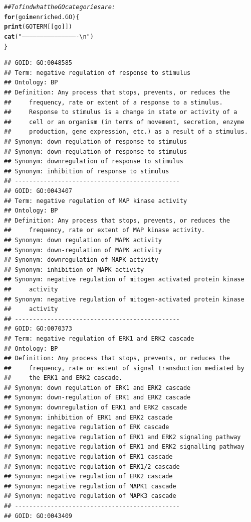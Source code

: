 \documentclass{article}\usepackage[]{graphicx}\usepackage[]{color}
\makeatletter
\newcommand{\hlstr}[1]{\textcolor[rgb]{0.192,0.494,0.8}{#1}}%
\newcommand{\hlcom}[1]{\textcolor[rgb]{0.678,0.584,0.686}{\textit{#1}}}%
\newcommand{\hlstd}[1]{\textcolor[rgb]{0.345,0.345,0.345}{#1}}%
\newcommand{\hlkwa}[1]{\textcolor[rgb]{0.161,0.373,0.58}{\textbf{#1}}}%
\newcommand{\hlkwd}[1]{\textcolor[rgb]{0.737,0.353,0.396}{\textbf{#1}}}%
\newenvironment{kframe}{%
 \def\at@end@of@kframe{}%
 \ifinner\ifhmode%
  \def\at@end@of@kframe{\end{minipage}}%
  \begin{minipage}{\columnwidth}%
 \fi\fi%
 \def\FrameCommand##1{\hskip\@totalleftmargin \hskip-\fboxsep
 \colorbox{shadecolor}{##1}\hskip-\fboxsep
     \hskip-\linewidth \hskip-\@totalleftmargin \hskip\columnwidth}%
 \MakeFramed {\advance\hsize-\width
   \@totalleftmargin\z@ \linewidth\hsize
   \@setminipage}}%
 {\par\unskip\endMakeFramed%
 \at@end@of@kframe}
\newenvironment{knitrout}{}{} %
\makeatother
\begin{document}
\begin{knitrout}
\begin{kframe}
\begin{alltt}
\hlcom{## To find what the GO categories are:  }
\hlkwa{for} \hlstd{(go} \hlkwa{in} \hlstd{enriched.GO)\{}
  \hlkwd{print}\hlstd{(GOTERM[[go]])}
  \hlkwd{cat}\hlstd{(}\hlstr{"----------------------------------------------\textbackslash{}n"}\hlstd{)}
  \hlstd{\}}
\end{alltt}
\begin{verbatim}
## GOID: GO:0048585
## Term: negative regulation of response to stimulus
## Ontology: BP
## Definition: Any process that stops, prevents, or reduces the
##     frequency, rate or extent of a response to a stimulus.
##     Response to stimulus is a change in state or activity of a
##     cell or an organism (in terms of movement, secretion, enzyme
##     production, gene expression, etc.) as a result of a stimulus.
## Synonym: down regulation of response to stimulus
## Synonym: down-regulation of response to stimulus
## Synonym: downregulation of response to stimulus
## Synonym: inhibition of response to stimulus
## ----------------------------------------------
## GOID: GO:0043407
## Term: negative regulation of MAP kinase activity
## Ontology: BP
## Definition: Any process that stops, prevents, or reduces the
##     frequency, rate or extent of MAP kinase activity.
## Synonym: down regulation of MAPK activity
## Synonym: down-regulation of MAPK activity
## Synonym: downregulation of MAPK activity
## Synonym: inhibition of MAPK activity
## Synonym: negative regulation of mitogen activated protein kinase
##     activity
## Synonym: negative regulation of mitogen-activated protein kinase
##     activity
## ----------------------------------------------
## GOID: GO:0070373
## Term: negative regulation of ERK1 and ERK2 cascade
## Ontology: BP
## Definition: Any process that stops, prevents, or reduces the
##     frequency, rate or extent of signal transduction mediated by
##     the ERK1 and ERK2 cascade.
## Synonym: down regulation of ERK1 and ERK2 cascade
## Synonym: down-regulation of ERK1 and ERK2 cascade
## Synonym: downregulation of ERK1 and ERK2 cascade
## Synonym: inhibition of ERK1 and ERK2 cascade
## Synonym: negative regulation of ERK cascade
## Synonym: negative regulation of ERK1 and ERK2 signaling pathway
## Synonym: negative regulation of ERK1 and ERK2 signalling pathway
## Synonym: negative regulation of ERK1 cascade
## Synonym: negative regulation of ERK1/2 cascade
## Synonym: negative regulation of ERK2 cascade
## Synonym: negative regulation of MAPK1 cascade
## Synonym: negative regulation of MAPK3 cascade
## ----------------------------------------------
## GOID: GO:0043409

\end{verbatim}
\end{kframe}
\end{knitrout}
\end{document}
